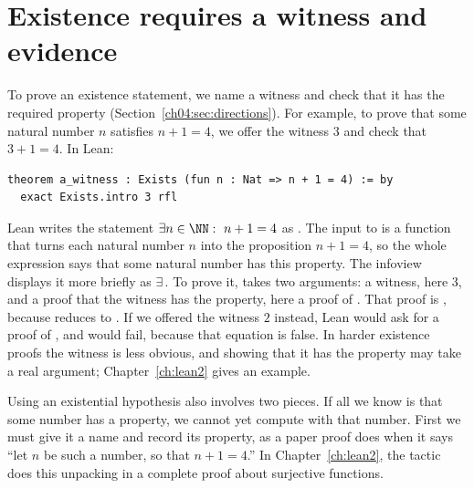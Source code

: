 \section{Existence requires a witness and evidence}\label{ch15:sec:exists}
To prove an existence statement, we name a witness and check that it has the required property (Section~\ref{ch04:sec:directions}). For example, to prove that some natural number $n$ satisfies $n+1=4$, we offer the witness $3$ and check that $3+1=4$. In Lean:
\par\noindent\begin{minipage}{\linewidth}
\begin{lstlisting}
theorem a_witness : Exists (fun n : Nat => n + 1 = 4) := by
  exact Exists.intro 3 rfl
\end{lstlisting}
\end{minipage}\par

Lean writes the statement $\exists n\in\NN:\ n+1=4$ as . The input to  is a function that turns each natural number $n$ into the proposition $n+1=4$, so the whole expression says that some natural number has this property. The infoview displays it more briefly as $\exists$\,. To prove it,  takes two arguments: a witness, here $3$, and a proof that the witness has the property, here a proof of . That proof is , because  reduces to . If we offered the witness $2$ instead, Lean would ask for a proof of , and  would fail, because that equation is false. In harder existence proofs the witness is less obvious, and showing that it has the property may take a real argument; Chapter~\ref{ch:lean2} gives an example.

Using an existential hypothesis also involves two pieces. If all we know is that some number has a property, we cannot yet compute with that number. First we must give it a name and record its property, as a paper proof does when it says ``let $n$ be such a number, so that $n+1=4$.'' In Chapter~\ref{ch:lean2}, the tactic  does this unpacking in a complete proof about surjective functions.

